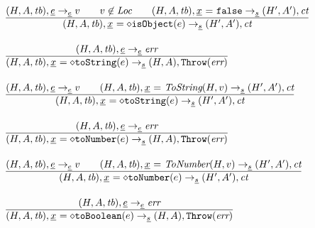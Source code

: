 \[\begin{array}{l@{~~}l@{~~}ll}
\frac{\begin{matrix}
\evale, \ir{\expr} \rightarrow_{\ir\expr} v
\rulesep
v\not\in\Loc
\rulesep
\state, \irid \ {\tt =} \ \false \rightarrow_{\ir\stmt} \resp, \ct
\end{matrix}}{\begin{matrix}
\state, \irid \ {\tt = {\diamond}isObject}(e)  \rightarrow_{\ir\stmt} \resp, \ct
\end{matrix}}
\\[2em]

\frac{\begin{matrix}
\evale, \ir{\expr} \rightarrow_{\ir\expr} \err
\end{matrix}}{\begin{matrix}
\state, \irid \ {\tt = {\diamond}toString}(e)  \rightarrow_{\ir\stmt} \res, \error
\end{matrix}}
\\[2em]

\frac{\begin{matrix}
\evale, \ir{\expr} \rightarrow_{\ir\expr} v
\rulesep
\state, \irid \ {\tt =} \ \hf{ToString}(H,v) \rightarrow_{\ir\stmt} \resp, \ct
\end{matrix}}{\begin{matrix}
\state, \irid \ {\tt = {\diamond}toString}(e)  \rightarrow_{\ir\stmt} \resp, \ct
\end{matrix}}
\\[2em]

\frac{\begin{matrix}
\evale, \ir{\expr} \rightarrow_{\ir\expr} \err
\end{matrix}}{\begin{matrix}
\state, \irid \ {\tt = {\diamond}toNumber}(e)  \rightarrow_{\ir\stmt} \res, \error
\end{matrix}}
\\[2em]

\frac{\begin{matrix}
\evale, \ir{\expr} \rightarrow_{\ir\expr} v
\rulesep
\state, \irid \ {\tt =} \ \hf{ToNumber}(H,v) \rightarrow_{\ir\stmt} \resp, \ct
\end{matrix}}{\begin{matrix}
\state, \irid \ {\tt = {\diamond}toNumber}(e)  \rightarrow_{\ir\stmt} \resp, \ct
\end{matrix}}
\\[2em]

\frac{\begin{matrix}
\evale, \ir{\expr} \rightarrow_{\ir\expr} \err
\end{matrix}}{\begin{matrix}
\state, \irid \ {\tt = {\diamond}toBoolean}(e)  \rightarrow_{\ir\stmt} \res, \error
\end{matrix}}
\\[2em]


\end{array}\]
